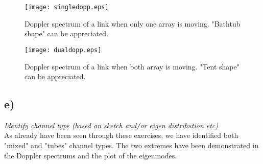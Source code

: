 \begin{figure}[!h]
  \centering
  \texttt{[image: singledopp.eps]}
  \caption{Doppler spectrum of a link when only one array is moving. "Bathtub shape" can be appreciated.}
  \label{fig:singledopp}
\end{figure}

\begin{figure}[!h]
  \centering
  \texttt{[image: dualdopp.eps]}
  \caption{Doppler spectrum of a link when both array is moving. "Tent shape" can be appreciated.}
  \label{fig:dualdopp}
\end{figure}

\subsection{e)}
\textit{Identify channel type (based on sketch and/or eigen distribution etc)}\\

As already have been seen through these exercises, we have identified both "mixed" and "tubes" channel types. The two extremes have been demonstrated in the Doppler spectrums and the plot of the eigenmodes.